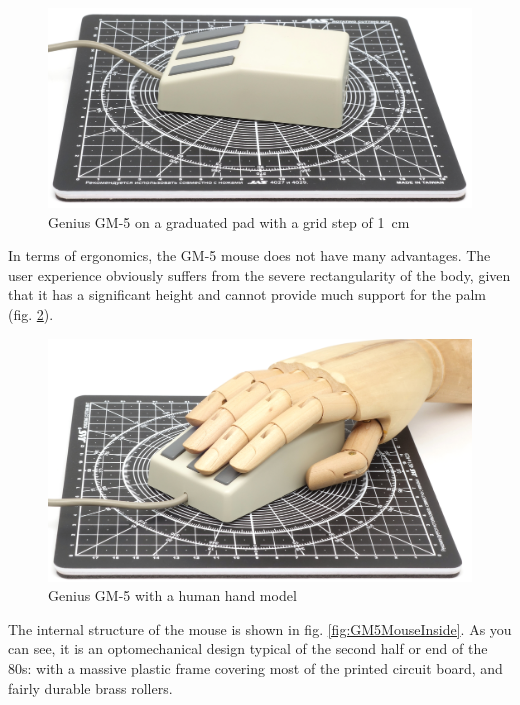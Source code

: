 \documentclass[11pt, a4paper]{article}
\begin{document}
\begin{figure}[h]
    \centering
    \includegraphics[scale=0.56]{1987_genius_gm5_mouse/size_30.jpg}
    \caption{Genius GM-5 on a graduated pad with a grid step of 1~cm}
    \label{fig:GM5MouseSize}
\end{figure}

In terms of ergonomics, the GM-5 mouse does not have many advantages. The user experience obviously suffers from the severe rectangularity of the body, given that it has a significant height and cannot provide much support for the palm (fig. \ref{fig:GM5MouseHand}).

\begin{figure}[h]
    \centering
    \includegraphics[scale=0.51]{1987_genius_gm5_mouse/hand_30.jpg}
    \caption{Genius GM-5 with a human hand model}
    \label{fig:GM5MouseHand}
\end{figure}

The internal structure of the mouse is shown in fig. \ref{fig:GM5MouseInside}. As you can see, it is an optomechanical design typical of the second half or end of the 80s: with a massive plastic frame covering most of the printed circuit board, and fairly durable brass rollers.
\end{document}
